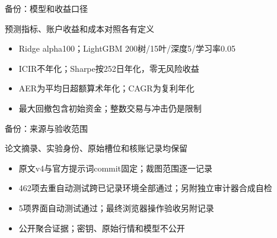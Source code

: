 \documentclass[aspectratio=169,10pt]{beamer}
\begin{document}
\begin{frame}{备份：模型和收益口径}
\begin{block}{}预测指标、账户收益和成本对照各有定义\end{block}
\small\begin{itemize}
\item Ridge alpha100；LightGBM 200树/15叶/深度5/学习率0.05
\item ICIR不年化；Sharpe按252日年化，零无风险收益
\item AER为平均日超额算术年化；CAGR为复利年化
\item 最大回撤包含初始资金；整数交易与冲击仍是限制
\end{itemize}
\end{frame}
\begin{frame}{备份：来源与验收范围}
\begin{block}{}论文摘录、实验身份、原始槽位和核账记录均保留\end{block}
\small\begin{itemize}
\item 原文v4与官方提示词commit固定；裁图范围逐一记录
\item 462项去重自动测试跨已记录环境全部通过；另附独立审计器合成自检
\item 5项界面自动测试通过；最终浏览器操作验收另附记录
\item 公开聚合证据；密钥、原始行情和模型不公开
\end{itemize}
\end{frame}
\end{document}
